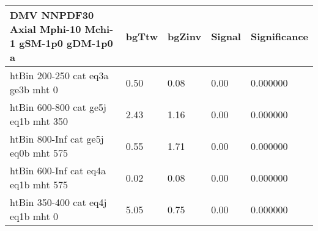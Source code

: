  \begin{tabular}{|l|l|l|l|l|}
\small
   \label{mostSensitiveBins_DMV_NNPDF30_Axial_Mphi-10_Mchi-1_gSM-1p0_gDM-1p0_25ns}
   \textbf{DMV NNPDF30 Axial Mphi-10 Mchi-1 gSM-1p0 gDM-1p0}	 a& 	bgTtw	 & 	bgZinv	 & 	Signal &	 Significance \\ 
	\hline
	htBin 200-250 cat eq3a ge3b mht 0 & 	0.50	 & 	0.08	 & 	0.00 	&0.000000 \\ 
	htBin 600-800 cat ge5j eq1b mht 350 & 	2.43	 & 	1.16	 & 	0.00 	&0.000000 \\ 
	htBin 800-Inf cat ge5j eq0b mht 575 & 	0.55	 & 	1.71	 & 	0.00 	&0.000000 \\ 
	htBin 600-Inf cat eq4a eq1b mht 575 & 	0.02	 & 	0.08	 & 	0.00 	&0.000000 \\ 
	htBin 350-400 cat eq4j eq1b mht 0 & 	5.05	 & 	0.75	 & 	0.00 	&0.000000 \\ 
\end{tabular}

